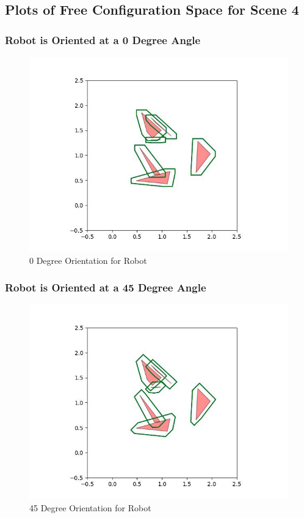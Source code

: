 \documentclass{article}
\begin{document}
\newpage
\subsection{Plots of Free Configuration Space for Scene 4}
\subsubsection{Robot is Oriented at a 0 Degree Angle}
\begin{figure}[h!]
	\includegraphics[width= 0.9 \linewidth]{Problem3_minkowski4_0.jpg}
	\centering
	\caption{0 Degree Orientation for Robot}
	\label{Problem3_minkowski4_0.jpg}
\end{figure}

\newpage
\subsubsection{Robot is Oriented at a 45 Degree Angle}
\begin{figure}[h!]
	\includegraphics[width= 0.9 \linewidth]{Problem3_minkowski4_45.jpg}
	\centering
	\caption{45 Degree Orientation for Robot}
	\label{Problem3_minkowski4_45.jpg}
\end{figure}
\end{document}
